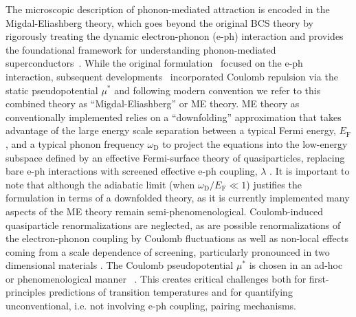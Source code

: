 \documentclass[%
 reprint,
superscriptaddress,
 amsmath,amssymb,
 aps,
prx,
]{revtex4-2}
\newcommand{\change}[2]{{\sout{#1} {\color{orange} {#2}}}}
\newcommand{\txD}{\text{D}}
\newcommand{\txF}{\text{F}}
\newcommand{\ajm}[1]{{\color{blue} #1}}
\begin{document}
The microscopic description of phonon-mediated attraction is encoded in the Migdal-Eliashberg  theory, 
which goes beyond the original BCS theory by rigorously treating the dynamic electron-phonon (e-ph) interaction and provides
the foundational framework for understanding phonon-mediated superconductors~\cite{migdal1958,eliashberg1960interactions,eliashberg1961temperature}.
While the original formulation~\cite{migdal1958,eliashberg1960interactions} focused on the e-ph interaction, subsequent developments~\cite{tolmachev1961logarithmic,morel_anderson} incorporated Coulomb repulsion via the static pseudopotential $\mu^*$ and following modern convention we refer to this combined theory as ``Migdal-Eliashberg'' or ME theory.
ME theory as conventionally implemented relies on a ``downfolding'' approximation \cite{eliashberg1960interactions, eliashberg1961temperature, tolmachev1961logarithmic, mcmillan1968, allen1975, EPW1,EPW2,AEPW} that takes advantage of the large energy scale separation between a typical Fermi energy, $E_\txF$, and a typical phonon frequency $\omega_\txD$ to project the equations into the low-energy subspace defined by an effective Fermi-surface theory of quasiparticles, replacing bare e-ph interactions with screened effective e-ph coupling, $\lambda$ \cite{eliashberg1960interactions,eliashberg1961temperature}.
It is important to note that although the adiabatic limit (when $\omega_\txD/E_\txF \ll 1$) justifies the formulation in terms of a downfolded theory, as it is currently implemented many aspects of the ME theory remain semi-phenomenological.
Coulomb-induced quasiparticle renormalizations are neglected, as are possible renormalizations of the electron-phonon coupling by Coulomb fluctuations {as well as non-local effects coming from a scale dependence of screening, particularly pronounced in two dimensional materials \cite{Simonato23}.}
The Coulomb pseudopotential $\mu^*$ is chosen in an ad-hoc or phenomenological manner ~\cite{RAINER1986371}.
This creates critical challenges both for first-principles predictions of transition temperatures and for quantifying unconventional, i.e. not involving e-ph coupling, pairing mechanisms.
\end{document}
